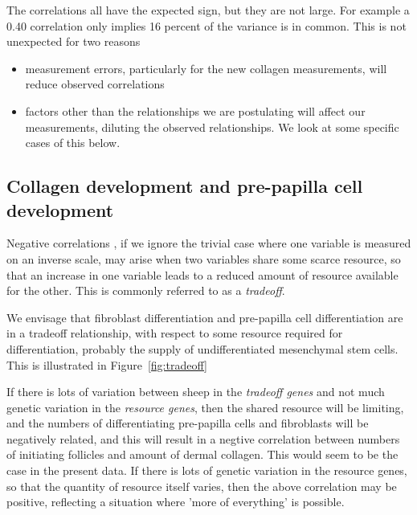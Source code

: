 \documentclass[titlepage]{article}  %
\begin{document}
The correlations all have the expected sign, but they are not large. For example a 0.40 correlation only implies 16 percent of the variance is in common. This is not unexpected for two reasons
\begin{itemize}
\item measurement errors, particularly for the new collagen measurements, will reduce observed correlations
\item factors other than the relationships we are postulating will affect our measurements, diluting the observed relationships. We look at some specific cases of this below.
\end{itemize}

\subsection{Collagen development and pre-papilla cell development}
Negative correlations , if we ignore the trivial case where one variable is measured on an inverse scale, may arise when two variables share some scarce resource, so that an increase in one variable leads to a reduced amount of resource available for the other. This is commonly referred to as a {\em tradeoff}.

We envisage that fibroblast differentiation and pre-papilla cell differentiation are in a tradeoff relationship, with respect to some resource required for differentiation, probably the supply of undifferentiated mesenchymal stem cells. This is illustrated in Figure~\ref{fig:tradeoff}


If there is lots of variation between sheep in the {\em tradeoff genes} and not much genetic variation in the {\em resource genes}, then the shared resource will be limiting, and the numbers of differentiating pre-papilla cells and fibroblasts will be negatively related, and this will result in a negtive correlation between numbers of initiating follicles and amount of dermal collagen. This would seem to be the case in the present data. If there is lots of genetic variation in the resource genes, so that the quantity of resource itself varies, then the above correlation may be positive, reflecting a situation where 'more of everything' is possible. 
\end{document}
